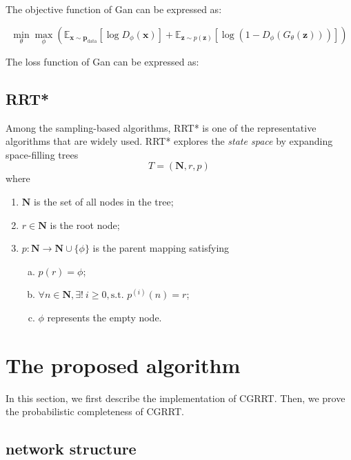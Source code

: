 \documentclass[smallcondensed]{svjour3}     %
\begin{document}
The objective function of Gan can be expressed as:

\begin{equation}\label{equation: objective funtion-gan}
	\min_{\theta} \max_{\phi} ( \mathbb{E}_{\mathbf{x} \sim \textbf{p}_{\textrm{data}}}[\log D_\phi(\textbf{x})] + 
	\mathbb{E}_{\mathbf{z} \sim p(\textbf{z})}[\log (1-D_\phi(G_\theta(\textbf{z})))] )
\end{equation}

The loss function of Gan can be expressed as:



\subsection{RRT*}\label{subsection: rrt-star}
Among the sampling-based algorithms, RRT* is one of the representative algorithms that are widely used.
RRT* explores the \emph{state space} by expanding space-filling trees
\begin{equation}\label{equation: space-filling trees}
	T = (\mathbf{N}, r, p)
\end{equation}
where
\begin{enumerate}[1)]
	\item $\mathbf{N}$ is the set of all nodes in the tree;
	\item $r \in \mathbf{N}$ is the root node;
	\item $p: \mathbf{N} \to \mathbf{N} \cup \{\phi\}$ is the parent mapping satisfying
	\begin{enumerate}[a)]
		\item $p(r) = \phi$;
		\item $\forall n \in \mathbf{N}, \exists ! \ i \geq 0, \textrm{s.t. } p^{(i)}(n) =r$;
		\item $\phi$ represents the empty node.
	\end{enumerate}
\end{enumerate}

\section{The proposed algorithm}
In this section, we first describe the implementation of CGRRT.
Then, we prove the probabilistic completeness of CGRRT.

\subsection{network structure}
\end{document}
